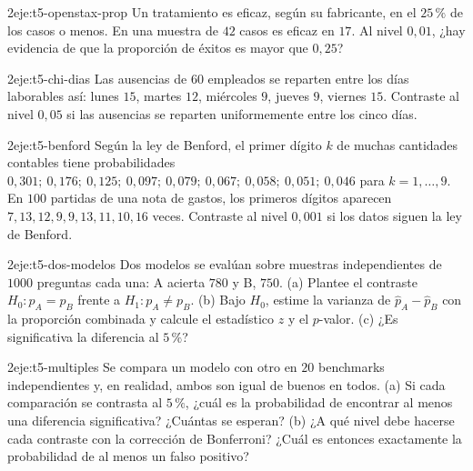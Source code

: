 \begin{ejercicio}{2}{eje:t5-openstax-prop}
Un tratamiento es eficaz, según su fabricante, en el $25\,\%$ de los casos o menos. En una muestra de $42$ casos es eficaz en $17$. Al nivel $0{,}01$, ¿hay evidencia de que la proporción de éxitos es mayor que $0{,}25$?
\end{ejercicio}

\begin{ejercicio}{2}{eje:t5-chi-dias}
Las ausencias de $60$ empleados se reparten entre los días laborables así: lunes $15$, martes $12$, miércoles $9$, jueves $9$, viernes $15$. Contraste al nivel $0{,}05$ si las ausencias se reparten uniformemente entre los cinco días.
\end{ejercicio}

\begin{ejercicio}{2}{eje:t5-benford}
Según la ley de Benford, el primer dígito $k$ de muchas cantidades contables tiene probabilidades $0{,}301;\allowbreak\ 0{,}176;\allowbreak\ 0{,}125;\allowbreak\ 0{,}097;\allowbreak\ 0{,}079;\allowbreak\ 0{,}067;\allowbreak\ 0{,}058;\allowbreak\ 0{,}051;\allowbreak\ 0{,}046$ para $k=1,\dots,9$. En $100$ partidas de una nota de gastos, los primeros dígitos aparecen $7,13,12,9,9,13,11,10,16$ veces. Contraste al nivel $0{,}001$ si los datos siguen la ley de Benford.
\end{ejercicio}

\begin{ejercicio}{2}{eje:t5-dos-modelos}
Dos modelos se evalúan sobre muestras independientes de $1000$ preguntas cada una: A acierta $780$ y B, $750$. (a) Plantee el contraste $H_0:p_A=p_B$ frente a $H_1:p_A\neq p_B$. (b) Bajo $H_0$, estime la varianza de $\widehat p_A-\widehat p_B$ con la proporción combinada y calcule el estadístico $z$ y el $p$-valor. (c) ¿Es significativa la diferencia al $5\,\%$?
\end{ejercicio}

\begin{ejercicio}{2}{eje:t5-multiples}
Se compara un modelo con otro en $20$ benchmarks independientes y, en realidad, ambos son igual de buenos en todos. (a) Si cada comparación se contrasta al $5\,\%$, ¿cuál es la probabilidad de encontrar al menos una diferencia significativa? ¿Cuántas se esperan? (b) ¿A qué nivel debe hacerse cada contraste con la corrección de Bonferroni? ¿Cuál es entonces exactamente la probabilidad de al menos un falso positivo?
\end{ejercicio}

